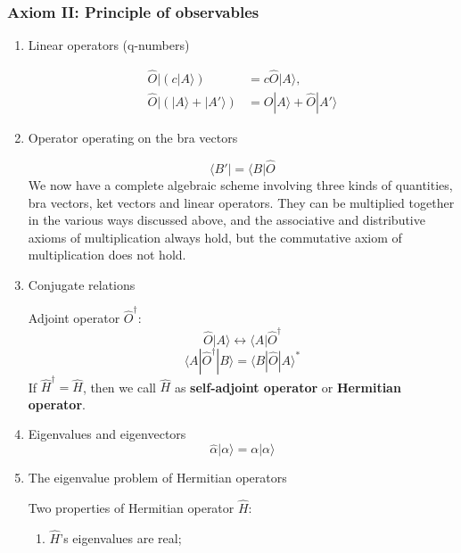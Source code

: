 \documentclass[12pt]{article}
\numberwithin{equation}{section}
\begin{document}
\subsubsection{Axiom II: Principle of observables}
\begin{enumerate}
\item {\color{red}Linear operators (q-numbers)} \par
	\begin{equation}\begin{split}
		\hat{O}|(c|A\rangle) &= c\hat{O}|A\rangle, \\
		\hat{O}|(|A\rangle+|A'\rangle) &= \hat{O}|A\rangle + \hat{O}|A'\rangle
	\end{split}\end{equation}
\item Operator operating on the bra vectors \par
	\begin{equation}
		\langle B'| = \langle B|\hat{O}
	\end{equation}
	We now have a complete algebraic scheme involving three kinds of quantities, {\color{red}bra vectors}, {\color{red}ket vectors} and {\color{red}linear operators}. They can be multiplied together in the various ways discussed above, and the associative and distributive axioms of multiplication always hold, but the commutative axiom of multiplication does not hold.
\item Conjugate relations \par
	Adjoint operator $\hat{O}^\dag$:
	\begin{equation}
		\hat{O} |A\rangle \leftrightarrow \langle A|\hat{O}^\dag
	\end{equation}
	\begin{equation}
		\langle A|\hat{O}^\dag|B\rangle = \langle B |\hat{O} |A\rangle^*
	\end{equation}
	If $\hat{H}^\dag=\hat{H}$, then we call $\hat{H}$ as \textbf{self-adjoint operator} or {\color{red}\textbf{Hermitian operator}}.
\item Eigenvalues and eigenvectors
	\begin{equation}
		\hat{\alpha} |\alpha \rangle = \alpha|\alpha \rangle
	\end{equation}
\item The eigenvalue problem of Hermitian operators \par
	Two properties of Hermitian operator $\hat{H}$:
	\begin{enumerate}
		\item $\hat{H}$'s eigenvalues are real;

\end{enumerate}
\end{enumerate}
\end{document}
